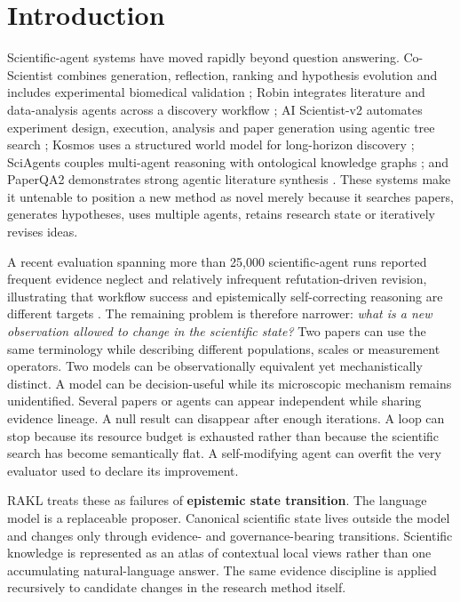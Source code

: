 \documentclass[11pt]{article}
\newcommand{\RAKL}{\textsc{RAKL}}
\begin{document}
\section{Introduction}
Scientific-agent systems have moved rapidly beyond question answering. Co-Scientist combines generation, reflection, ranking and hypothesis evolution and includes experimental biomedical validation \cite{gottweis2026}; Robin integrates literature and data-analysis agents across a discovery workflow \cite{ghareeb2026}; AI Scientist-v2 automates experiment design, execution, analysis and paper generation using agentic tree search \cite{yamada2025}; Kosmos uses a structured world model for long-horizon discovery \cite{mitchener2025}; SciAgents couples multi-agent reasoning with ontological knowledge graphs \cite{ghafarollahi2024}; and PaperQA2 demonstrates strong agentic literature synthesis \cite{skarlinski2024}. These systems make it untenable to position a new method as novel merely because it searches papers, generates hypotheses, uses multiple agents, retains research state or iteratively revises ideas.

A recent evaluation spanning more than 25,000 scientific-agent runs reported frequent evidence neglect and relatively infrequent refutation-driven revision, illustrating that workflow success and epistemically self-correcting reasoning are different targets \cite{riosgarcia2026}. The remaining problem is therefore narrower: \emph{what is a new observation allowed to change in the scientific state?} Two papers can use the same terminology while describing different populations, scales or measurement operators. Two models can be observationally equivalent yet mechanistically distinct. A model can be decision-useful while its microscopic mechanism remains unidentified. Several papers or agents can appear independent while sharing evidence lineage. A null result can disappear after enough iterations. A loop can stop because its resource budget is exhausted rather than because the scientific search has become semantically flat. A self-modifying agent can overfit the very evaluator used to declare its improvement.

\RAKL{} treats these as failures of \textbf{epistemic state transition}. The language model is a replaceable proposer. Canonical scientific state lives outside the model and changes only through evidence- and governance-bearing transitions. Scientific knowledge is represented as an atlas of contextual local views rather than one accumulating natural-language answer. The same evidence discipline is applied recursively to candidate changes in the research method itself.
\end{document}
